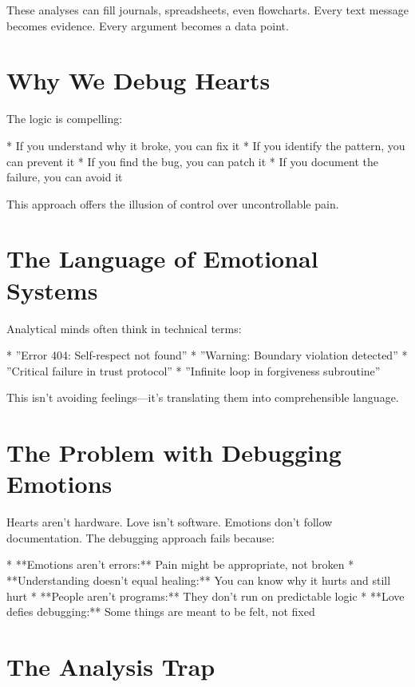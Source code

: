 \documentclass[12pt,oneside]{book}
\begin{document}
These analyses can fill journals, spreadsheets, even flowcharts. Every text message becomes evidence. Every argument becomes a data point.

\section{Why We Debug Hearts}

The logic is compelling:

                    * If you understand why it broke, you can fix it
                    * If you identify the pattern, you can prevent it
                    * If you find the bug, you can patch it
                    * If you document the failure, you can avoid it

This approach offers the illusion of control over uncontrollable pain.

\section{The Language of Emotional Systems}

Analytical minds often think in technical terms:

                    * ''Error 404: Self-respect not found''
                    * ''Warning: Boundary violation detected''
                    * ''Critical failure in trust protocol''
                    * ''Infinite loop in forgiveness subroutine''

This isn't avoiding feelings---it's translating them into comprehensible language.

\section{The Problem with Debugging Emotions}

Hearts aren't hardware. Love isn't software. Emotions don't follow documentation. The debugging approach fails because:

                    * **Emotions aren't errors:** Pain might be appropriate, not broken
                    * **Understanding doesn't equal healing:** You can know why it hurts and still hurt
                    * **People aren't programs:** They don't run on predictable logic
                    * **Love defies debugging:** Some things are meant to be felt, not fixed

\section{The Analysis Trap}
\end{document}
